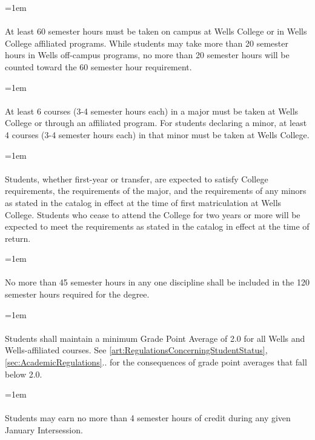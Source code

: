 \documentclass{manual}
\let\oldparagraph\paragraph
\renewcommand\paragraph{\leftskip=1em\oldparagraph}
\begin{document}
\paragraph{} At least 60 semester hours must be taken on campus at Wells College or in Wells College affiliated programs. While students may take more than 20 semester hours in Wells off-campus programs, no more than 20 semester hours will be counted toward the 60 semester hour requirement.

\paragraph{} At least 6 courses (3-4 semester hours each) in a major must be taken at Wells College or through an affiliated program. For students declaring a minor, at least 4 courses (3-4 semester hours each) in that minor must be taken at Wells College.

\paragraph{} Students, whether first-year or transfer, are expected to satisfy College requirements, the requirements of the major, and the requirements  of any minors as stated in the catalog in effect at the time of first matriculation at Wells College. Students who cease to attend the College for two years or more will be expected to meet the requirements as stated in the catalog in effect at the time of return.

\paragraph{} No more than 45 semester hours in any one discipline shall be included   in the 120 semester hours required for the degree.

\paragraph{} Students shall maintain a minimum Grade Point Average of 2.0 for all Wells and Wells-affiliated courses. See \cref{art:RegulationsConcerningStudentStatus}, \cref{sec:AcademicRegulations}.. for the consequences of grade point averages that fall below 2.0.

\paragraph{} Students may earn no more than 4 semester hours of credit during any given January  Intersession.
\end{document}
